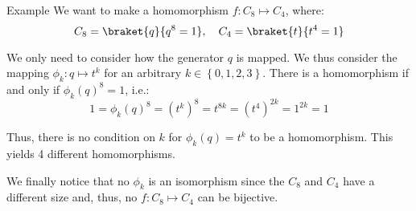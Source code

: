 \documentclass[a4paper]{article}
\begin{document}
\begin{parag}{Example}
    We want to make a homomorphism $f: C_8 \mapsto C_4$, where: 
    \[C_8 = \braket{q}{q^8 = 1}, \mathspace C_4 = \braket{t}{t^4 = 1}\]
    
    We only need to consider how the generator $q$ is mapped. We thus consider the mapping $\phi_k: q \mapsto t^k$ for an arbitrary $k \in \left\{0, 1, 2, 3\right\}$. There is a homomorphism if and only if $\phi_k\left(q\right)^8 = 1$, i.e.:
    \[1 = \phi_k\left(q\right)^8 = \left(t^k\right)^8 = t ^{8k} = \left(t^4\right)^{2k} = 1^{2k} = 1\]
    
    Thus, there is no condition on $k$ for $\phi_k\left(q\right) = t^k$ to be a homomorphism. This yields 4 different homomorphisms.

    We finally notice that no $\phi_k$ is an isomorphism since the $C_8$ and $C_4$ have a different size and, thus, no $f: C_8 \mapsto C_4$ can be bijective.
\end{parag}
\end{document}
